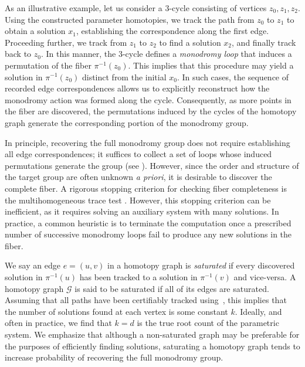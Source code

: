 \documentclass[11pt]{amsart}
\let\oldtextit\textit
\renewcommand\emph[1]{\oldtextit{\color{blue}#1}}
\theoremstyle{definition}
\theoremstyle{remark}
\begin{document}
As an illustrative example, let us consider a $3$-cycle consisting of vertices $z_0, z_1, z_2$. Using the constructed parameter homotopies, we track the path from $z_0$ to $z_1$ to obtain a solution $x_1$, establishing the correspondence along the first edge. Proceeding further, we track from $z_1$ to $z_2$ to find a solution $x_2$, and finally track back to $z_0$.
In this manner, the $3$-cycle defines a \emph{monodromy loop} that induces a permutation of the fiber $\pi^{-1}(z_0)$.
This implies that this procedure may yield a solution in $\pi^{-1}(z_0)$ distinct from the initial $x_0$. In such cases, the sequence of recorded edge correspondences allows us to explicitly reconstruct how the monodromy action was formed along the cycle. Consequently, as more points in the fiber are discovered, the permutations induced by the cycles of the homotopy graph generate the corresponding portion of the monodromy group.




In principle, recovering the full monodromy group does not require establishing all edge correspondences; it suffices to collect a set of loops whose induced permutations generate the group (see ). However, since the order and structure of the target group are often unknown \textit{a priori}, it is desirable to discover the complete fiber. A rigorous stopping criterion for checking fiber completeness is the multihomogeneous trace test \cite{leykin2018trace}. However, this stopping criterion can be inefficient, as it requires solving an auxiliary system with many solutions. In practice, a common heuristic is to terminate the computation once a prescribed number of successive monodromy loops fail to produce any new solutions in the fiber.

We say an edge $e=(u, v)$ in a homotopy graph is \emph{saturated} if every discovered solution in $\pi^{-1} (u)$ has been tracked to a solution in $\pi^{-1} (v)$ and vice-versa.
A homotopy graph $\mathcal{G}$ is said to be saturated if all of its edges are saturated. 
Assuming that all paths have been certifiably tracked using~, this implies that the number of solutions found at each vertex is some constant $k.$ 
Ideally, and often in practice, we find that $k=d$ is the true root count of the parametric system.
We emphasize that although a non-saturated graph may be preferable for the purposes of efficiently finding solutions, saturating a homotopy graph tends to increase probability of recovering the full monodromy group.
\end{document}
